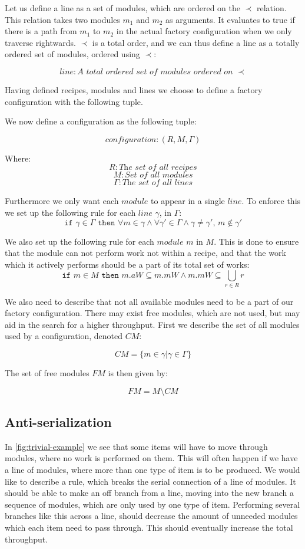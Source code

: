 Let us define a line as a set of modules, which are ordered on the $\prec$ relation. This relation takes two modules $m_1$ and $m_2$ as arguments. It evaluates to true if there is a path from $m_1$ to $m_2$ in the actual factory configuration when we only traverse rightwards. $\prec$ is a total order, and we can thus define a line as a totally ordered set of modules, ordered using $\prec$:

\[line: \textit{A total ordered set of modules ordered on } \prec\]

Having defined recipes, modules and lines we choose to define a factory configuration with the following tuple. 

We now define a configuration as the following tuple:

\[configuration: (R, M, \Gamma)\]

Where:
\[R: \textit{The set of all recipes}\]
\[M: \textit{Set of all modules}\]
\[\Gamma: \textit{The set of all lines}\]


Furthermore we only want each $module$ to appear in a single $line$. To enforce this we set up the following rule for each $line$ $\gamma$, in $\Gamma$:
\[\texttt{if } \gamma \in \Gamma \texttt{ then } \forall m \in \gamma \land \forall \gamma ' \in \Gamma \land \gamma \neq \gamma ',\, m \notin \gamma ' \]


We also set up the following rule for each $module$ $m$ in $M$. This is done to ensure that the module can not perform work not within a recipe, and that the work which it actively performs should be a part of its total set of works:
\[\texttt{if } m \in M \texttt{ then } m.aW \subseteq m.mW \land m.mW \subseteq  \bigcup_{r\in R}r\] 

We also need to describe that not all available modules need to be a part of our factory configuration. There may exist free modules, which are not used, but may aid in the search for a higher throughput. First we describe the set of all modules used by a configuration, denoted $CM$:

\[CM = \{m \in \gamma | \gamma \in \Gamma \}\]

The set of free modules $FM$ is then given by:

\[FM = M \setminus CM \]


\subsection{Anti-serialization}
In \cref{fig:trivial-example} we see that some items will have to move through modules, where no work is performed on them. This will often happen if we have a line of modules, where more than one type of item is to be produced. We would like to describe a rule, which breaks the serial connection of a line of modules. It should be able to make an off branch from a line, moving into the new branch a sequence of modules, which are only used by one type of item. Performing several branches like this across a line, should decrease the amount of unneeded modules which each item need to pass through. This should eventually increase the total throughput.

